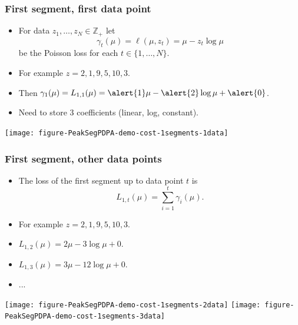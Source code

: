 \documentclass{beamer}
\newcommand{\ZZ}{\mathbb Z}
\begin{document}
\begin{frame}
  \frametitle{First segment, first data point}
  \begin{itemize}
  \item For data $z_1, \dots, z_N\in\ZZ_+$ let
  \begin{equation*}
    \gamma_t(\mu) = \ell(\mu, z_t) = \mu - z_t \log \mu
  \end{equation*}
  be the Poisson loss for each $t\in\{1, \dots, N\}$.
\item For example $z = 2, 1, 9, 5, 10, 3$.
\item Then $\gamma_1(\mu)=L_{1,1}(\mu)= \alert{1}\mu - \alert{2}\log \mu + \alert{0}$.
\item Need to store 3 coefficients (\alert{linear}, \alert{log}, \alert{constant}).
  \end{itemize}
  \begin{center}
    \texttt{[image: figure-PeakSegPDPA-demo-cost-1segments-1data]}
  \end{center}
\end{frame}

\begin{frame}
  \frametitle{First segment, other data points}
  \begin{itemize}
\item
  The loss of the first segment up to data point $t$ is
  \begin{equation*}
    \label{eq:C1b}
    L_{1,t}(\mu) = \sum_{i=1}^t \gamma_i(\mu).
  \end{equation*}
\item For example $z = 2, 1, 9, 5, 10, 3$.
\item $L_{1,2}(\mu) = 2\mu - 3\log\mu + 0$.
\item $L_{1,3}(\mu) = 3\mu - 12\log\mu + 0$.
\item ...
  \end{itemize}
  \begin{center}
    \texttt{[image: figure-PeakSegPDPA-demo-cost-1segments-2data]}
    \texttt{[image: figure-PeakSegPDPA-demo-cost-1segments-3data]}
  \end{center}
\end{frame}
\end{document}
